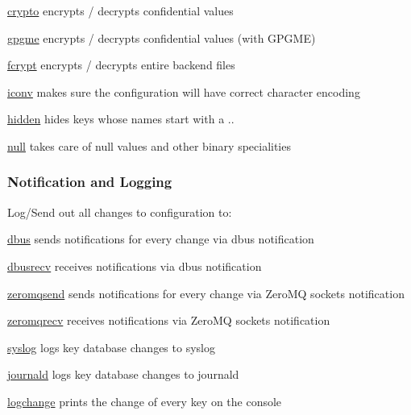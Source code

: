 \begin{DoxyItemize}
\item \hyperlink{md_src_plugins_crypto_README_src_plugins_crypto_README_md}{crypto} encrypts / decrypts confidential values
\item \hyperlink{md_src_plugins_gpgme_README_src_plugins_gpgme_README_md}{gpgme} encrypts / decrypts confidential values (with G\+P\+G\+ME)
\item \hyperlink{md_src_plugins_fcrypt_README_src_plugins_fcrypt_README_md}{fcrypt} encrypts / decrypts entire backend files
\item \hyperlink{md_src_plugins_iconv_README_src_plugins_iconv_README_md}{iconv} makes sure the configuration will have correct character encoding
\item \hyperlink{md_src_plugins_hidden_README_src_plugins_hidden_README_md}{hidden} hides keys whose names start with a {\ttfamily .}.
\item \hyperlink{md_src_plugins_null_README_src_plugins_null_README_md}{null} takes care of null values and other binary specialities
\end{DoxyItemize}

\subsubsection*{Notification and Logging}

Log/\+Send out all changes to configuration to\+:


\begin{DoxyItemize}
\item \hyperlink{md_src_plugins_dbus_README_src_plugins_dbus_README_md}{dbus} sends notifications for every change via dbus {\ttfamily notification}
\item \hyperlink{md_src_plugins_dbusrecv_README_src_plugins_dbusrecv_README_md}{dbusrecv} receives notifications via dbus {\ttfamily notification}
\item \hyperlink{md_src_plugins_zeromqsend_README_src_plugins_zeromqsend_README_md}{zeromqsend} sends notifications for every change via Zero\+MQ sockets {\ttfamily notification}
\item \hyperlink{md_src_plugins_zeromqrecv_README_src_plugins_zeromqrecv_README_md}{zeromqrecv} receives notifications via Zero\+MQ sockets {\ttfamily notification}
\item \hyperlink{md_src_plugins_syslog_README_src_plugins_syslog_README_md}{syslog} logs key database changes to syslog
\item \hyperlink{md_src_plugins_journald_README_src_plugins_journald_README_md}{journald} logs key database changes to journald
\item \hyperlink{md_src_plugins_logchange_README_src_plugins_logchange_README_md}{logchange} prints the change of every key on the console
\end{DoxyItemize}

